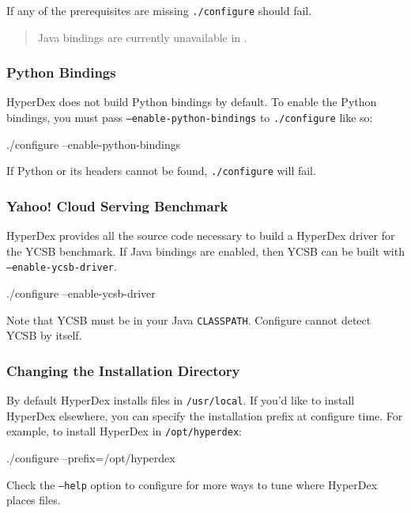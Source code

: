 If any of the prerequisites are missing \texttt{./configure} should fail.

\begin{quote}
Java bindings are currently unavailable in \HyperDexVersion.
\end{quote}

\subsubsection{Python Bindings}

HyperDex does not build Python bindings by default.  To enable the Python
bindings, you must pass \texttt{--enable-python-bindings} to
\texttt{./configure} like so:

\begin{consolecode}
./configure --enable-python-bindings
\end{consolecode}

If Python or its headers cannot be found, \texttt{./configure} will fail.

\subsubsection{Yahoo! Cloud Serving Benchmark}

HyperDex provides all the source code necessary to build a HyperDex driver
for the YCSB benchmark.  If Java bindings are enabled, then YCSB can be built
with \texttt{--enable-ycsb-driver}.

\begin{consolecode}
./configure --enable-ycsb-driver
\end{consolecode}

Note that YCSB must be in your Java \texttt{CLASSPATH}.  Configure cannot detect
YCSB by itself.

\subsubsection{Changing the Installation Directory}

By default HyperDex installs files in \texttt{/usr/local}.  If you'd like to
install HyperDex elsewhere, you can specify the installation prefix at configure
time.  For example, to install HyperDex in \texttt{/opt/hyperdex}:

\begin{consolecode}
./configure --prefix=/opt/hyperdex
\end{consolecode}

Check the \texttt{--help} option to configure for more ways to tune where
HyperDex places files.

